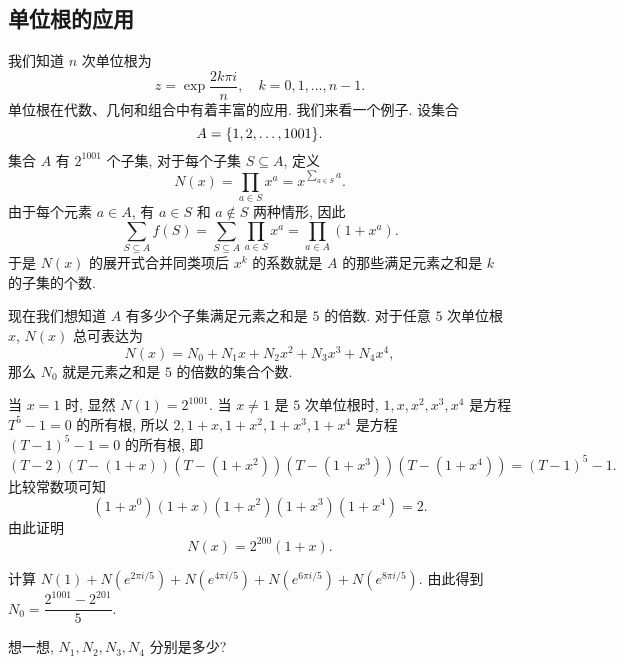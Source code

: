 \subsection{单位根的应用}
我们知道 $n$ 次单位根为
\[
  z=\exp\frac{2k\pi i}n,\quad k=0,1,\dots,n-1.
\]
单位根在代数、几何和组合中有着丰富的应用. 我们来看一个例子.
设集合
\[
  A={\left\{1,2,\dots,1001\right\}}.
\]
集合 $A$ 有 $2^{1001}$ 个子集, 对于每个子集 $S\subseteq A$, 定义
\[
  N(x)=\prod_{a\in S}x^a=x^{\sum_{a\in S}a}.
\]
由于每个元素 $a\in A$, 有 $a\in S$ 和 $a\notin S$ 两种情形, 因此
\[
  \sum_{S\subseteq A}f(S)
  =\sum_{S\subseteq A}\prod_{a\in S}x^a
  =\prod_{a\in A}(1+x^a).
\]
于是 $N(x)$ 的展开式合并同类项后 $x^k$ 的系数就是 $A$ 的那些满足元素之和是 $k$ 的子集的个数.
\begin{subex}
  \item 现在我们想知道 $A$ 有多少个子集满足元素之和是 $5$ 的倍数.
  对于任意 $5$ 次单位根 $x$, $N(x)$ 总可表达为
  \[
    N(x)=N_0+N_1x+N_2x^2+N_3x^3+N_4x^4,
  \]
  那么 $N_0$ 就是元素之和是 $5$ 的倍数的集合个数.
  \item 当 $x=1$ 时, 显然 $N(1)=2^{1001}$.
  当 $x\neq 1$ 是 $5$ 次单位根时, $1,x,x^2,x^3,x^4$ 是方程 $T^5-1=0$ 的所有根, 所以 $2,1+x,1+x^2,1+x^3,1+x^4$ 是方程 $(T-1)^5-1=0$ 的所有根, 即
  \[(T-2)(T-(1+x))(T-(1+x^2))(T-(1+x^3))(T-(1+x^4))=(T-1)^5-1.\]
  比较常数项可知
  \[(1+x^0)(1+x)(1+x^2)(1+x^3)(1+x^4)=2.\]
  由此证明
  \[N(x)=2^{200}(1+x).\]
  \item 计算 $N(1)+N(e^{2\pi i/5})+N(e^{4\pi i/5})+N(e^{6\pi i/5})+N(e^{8\pi i/5})$. 由此得到 $N_0=\dfrac{2^{1001}-2^{201}}5$.
  \item 想一想, $N_1,N_2,N_3,N_4$ 分别是多少?
\end{subex}




